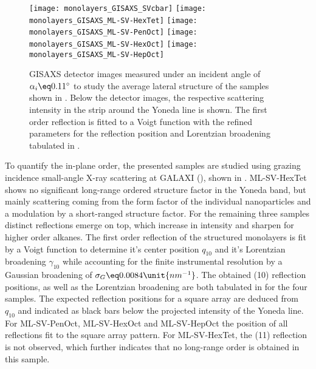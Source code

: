 \documentclass[\main/dresen_thesis.tex]{subfiles}
\begin{document}
    \begin{figure}[tb]
      \centering
      \texttt{[image: monolayers\_GISAXS\_SVcbar]}
      \texttt{[image: monolayers\_GISAXS\_ML-SV-HexTet]}
      \texttt{[image: monolayers\_GISAXS\_ML-SV-PenOct]}
      \texttt{[image: monolayers\_GISAXS\_ML-SV-HexOct]}
      \texttt{[image: monolayers\_GISAXS\_ML-SV-HepOct]}
      \caption{\label{fig:monolayers:preparation:solventVariation:gisaxs}GISAXS detector images measured under an incident angle of $\alpha_i \eq 0.11^\circ$ to study the average lateral structure of the samples shown in . Below the detector images, the respective scattering intensity in the strip around the Yoneda line is shown. The first order reflection is fitted to a Voigt function with the refined parameters for the reflection position and Lorentzian broadening tabulated in .}
    \end{figure}

    To quantify the in-plane order, the presented samples are studied using grazing incidence small-angle X-ray scattering at GALAXI (), shown in .
    ML-SV-HexTet shows no significant long-range ordered structure factor in the Yoneda band, but mainly scattering coming from the form factor of the individual nanoparticles and a modulation by a short-ranged structure factor.
    For the remaining three samples distinct reflections emerge on top, which increase in intensity and sharpen for higher order alkanes.
    The first order reflection of the structured monolayers is fit by a Voigt function to determine it's center position  $q_{10}$ and it's Lorentzian broadening $\gamma_{10}$ while accounting for the finite instrumental resolution by a Gaussian broadening of $\sigma_G \eq 0.0084 \unit{nm^{-1}}$.
    The obtained (10) reflection positions, as well as the Lorentzian broadening are both tabulated in  for the four samples.
    The expected reflection positions for a square array are deduced from $q_{10}$ and indicated as black bars below the projected intensity of the Yoneda line.
    For ML-SV-PenOct, ML-SV-HexOct and ML-SV-HepOct the position of all reflections fit to the square array pattern.
    For ML-SV-HexTet, the (11) reflection is not observed, which further indicates that no long-range order is obtained in this sample.
\end{document}
